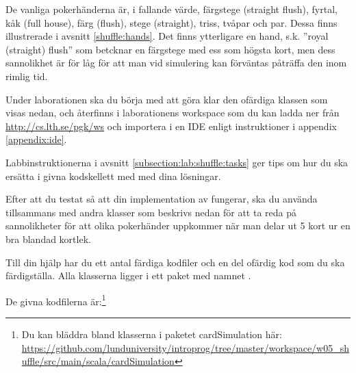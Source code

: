 De vanliga pokerhänderna är, i fallande värde, färgstege (straight flush), fyrtal, kåk (full house), färg (flush), stege (straight), triss, tvåpar och par. Dessa finns illustrerade i avsnitt \ref{shuffle:hands}.
Det finns ytterligare en hand, s.k. ''royal (straight) flush'' som betcknar en färgstege med ess som högsta kort, men dess sannolikhet är för låg för att man vid simulering kan förväntas påträffa den inom rimlig tid.

Under laborationen ska du börja med att göra klar den ofärdiga klassen  som visas nedan, och återfinns i laborationens workspace som du kan ladda ner från \url{http://cs.lth.se/pgk/ws} och importera i en IDE enligt instruktioner i appendix \ref{appendix:ide}.

\begin{figure}
\end{figure}

Labbinstruktionerna i avsnitt \ref{subsection:lab:shuffle:tasks} ger tips om hur du ska ersätta  i givna kodskellett med med dina lösningar.

Efter att du testat så att din implementation av  fungerar, ska du använda  tillsammans med andra klasser som beskrivs nedan för att ta reda på sannolikheter för att olika pokerhänder uppkommer när man delar ut 5 kort ur en bra  blandad kortlek.

Till din hjälp har du ett antal färdiga kodfiler och en del ofärdig kod som du ska färdigställa. Alla klasserna ligger i ett paket med namnet .

De givna kodfilerna är:\footnote{Du kan bläddra bland klasserna i paketet cardSimulation här: \\
\href{https://github.com/lunduniversity/introprog/tree/master/workspace/w05_shuffle/src/main/scala/cardSimulation}{\mbox{\fontsize{9}{11}\selectfont  https://github.com/lunduniversity/introprog/tree/master/workspace/w05\_shuffle/src/main/scala/cardSimulation}}}

